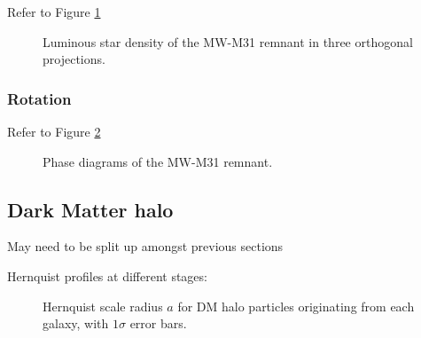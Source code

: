 \documentclass[twocolumn]{aastex63}
\newcommand{\todo}{\color{red}{TODO}\color{black}\hspace{2mm}}
\begin{document}
Refer to Figure \ref{fig:rem_shape}

\begin{figure}[htb!]
	\caption{Luminous star density of the MW-M31 remnant in three orthogonal projections.
	\label{fig:rem_shape}}
\end{figure}


\subsubsection{Rotation}

\todo{phase diagram}

Refer to Figure \ref{fig:rem_phase}

\begin{figure}[htb!]
	\caption{Phase diagrams of the MW-M31 remnant.
	\label{fig:rem_phase}}
\end{figure}

\todo{alignment between particles of different origin?}

\subsection{Dark Matter halo}

May need to be split up amongst previous sections

\todo{what happens during close approach? merger? remanant?}

Hernquist profiles at different stages: \todo{plot of scale radius evolution}

\begin{figure}[htb!]
	\caption{Hernquist scale radius $a$ for DM halo particles originating from each galaxy, with $1\sigma$ error bars.
		\label{fig:hernquist_a}}
\end{figure}


{}

\end{document}
